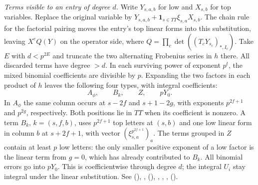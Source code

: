 \emph{Terms visible to an entry of degree $d$.}
Write $Y_{s,a,b}$ for low and $X_{s,b}$ for top variables. Replace the
original variable by $Y_{s,a,b}+\mathbf1_{s\in TT}\xi_{s,a}X_{s,b}$.
The chain rule for the factorial pairing moves the entry's top linear
forms into this substitution, leaving $X^e Q(Y)$ on the operator
side, where $Q=\prod_c\det((T_cY_{s_c})_{*,I_c})$.
Take $E$ with $d<p^{2E}$ and truncate the two alternating
Frobenius series in $h$ there. All discarded terms have degree $>d$.
In each surviving power of exponent $p^t$, the mixed binomial
coefficients are divisible by $p$. Expanding the two factors in each
product of $h$ leaves the following four types, with integral coefficients:
\[
 A_\phi,\qquad B_k,\qquad Z,\qquad pY_0 .
\]
In $A_\phi$ the same column occurs at $s-2f$ and $s+1-2g$,
with exponents $p^{2f+1}$ and $p^{2g}$, respectively. Both positions
lie in $TT$ when its coefficient is nonzero. A term $B_k$,
$k=(s,f,b)$, uses $p^{2f+1}$ top letters at $(s,b)$ and one low
linear form in column $b$ at $s+2f+1$, with vector
$(\xi_{s,a}^{p^{2f+1}})_a$. The terms grouped in $Z$ contain at least
$p$ low letters: the only smaller positive exponent of a low factor is
the linear term from $g=0$, which has already contributed to $B_k$.
All binomial errors go into $pY_0$. This is coefficientwise through
degree $d$; the integral $U_i$ stay integral under the linear
substitution. See  (),
,  (),
, , , 
().

